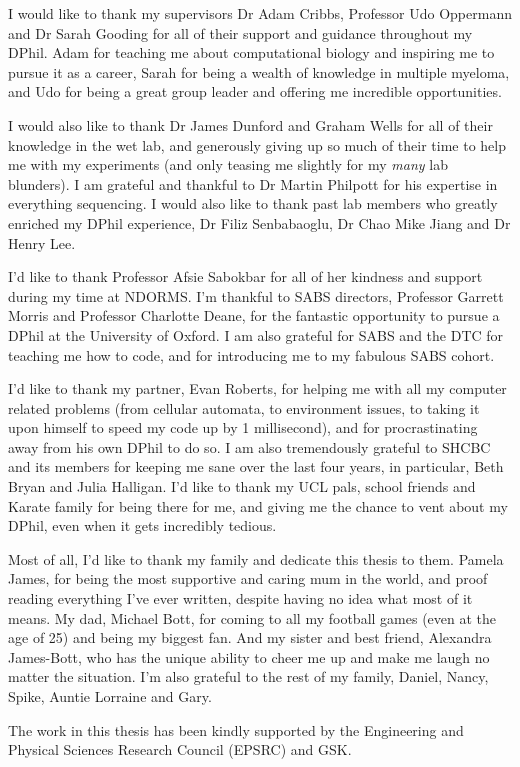 I would like to thank my supervisors Dr Adam Cribbs, Professor Udo Oppermann and Dr Sarah Gooding for all of their support and guidance throughout my DPhil.
Adam for teaching me about computational biology and inspiring me to pursue it as a career, Sarah for being a wealth of knowledge in multiple myeloma, and Udo for being a great group leader and offering me incredible opportunities.

I would also like to thank Dr James Dunford and Graham Wells for all of their knowledge in the wet lab, and generously giving up so much of their time to help me with my experiments (and only teasing me slightly for my \textit{many} lab blunders).
I am grateful and thankful to Dr Martin Philpott for his expertise in everything sequencing.
I would also like to thank past lab members who greatly enriched my DPhil experience, Dr Filiz Senbabaoglu, Dr Chao Mike Jiang and Dr Henry Lee.

I'd like to thank Professor Afsie Sabokbar for all of her kindness and support during my time at NDORMS. 
I'm thankful to SABS directors, Professor Garrett Morris and Professor Charlotte Deane, for the fantastic opportunity to pursue a DPhil at the University of Oxford. 
I am also grateful for SABS and the DTC for teaching me how to code, and for introducing me to my fabulous SABS cohort. 

I'd like to thank my partner, Evan Roberts, for helping me with all my computer related problems (from cellular automata, to environment issues, to taking it upon himself to speed my code up by 1 millisecond), and for procrastinating away from his own DPhil to do so. 
I am also tremendously grateful to SHCBC and its members for keeping me sane over the last four years, in particular, Beth Bryan and Julia Halligan.
I'd like to thank my UCL pals, school friends and Karate family for being there for me, and giving me the chance to vent about my DPhil, even when it gets incredibly tedious. 

Most of all, I'd like to thank my family and dedicate this thesis to them.
Pamela James, for being the most supportive and caring mum in the world, and proof reading everything I've ever written, despite having no idea what most of it means.
My dad, Michael Bott, for coming to all my football games (even at the age of 25) and being my biggest fan.
And my sister and best friend, Alexandra James-Bott, who has the unique ability to cheer me up and make me laugh no matter the situation.
I'm also grateful to the rest of my family, Daniel, Nancy, Spike, Auntie Lorraine and Gary.

The work in this thesis has been kindly supported by the Engineering and Physical Sciences Research Council (EPSRC) and GSK.